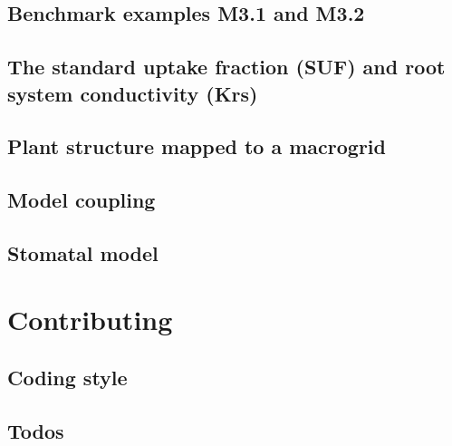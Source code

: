 \documentclass[a4paper]{article}
\begin{document}
\subsection{Benchmark examples M3.1 and M3.2} \label{ssec:benchmarks3x}
% 

\subsection{The standard uptake fraction (SUF) and root system conductivity (Krs)} \label{ssec:suf}
% 

\subsection{Plant structure mapped to a macrogrid} \label{ssec:mapped}
% 

\subsection{Model coupling} \label{ssec:coupling}
% 

\subsection{Stomatal model} \label{ssec:stomatal}
% 


\newpage
\section{Contributing} \label{sec:contributing}

\subsection{Coding style} \label{ssec:coding_style}


\subsection{Todos} \label{ssec:todos}





\newpage
 
 
\end{document}
